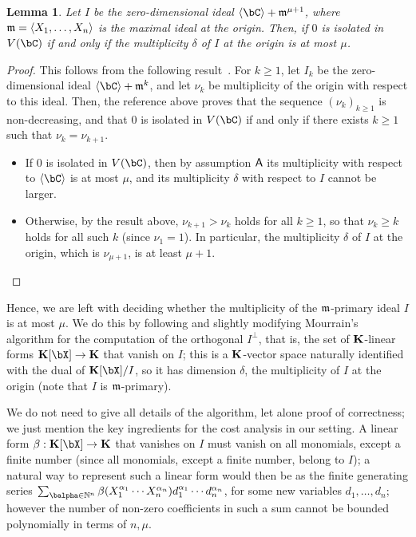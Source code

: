 \documentclass[12pt]{article}
\newtheorem{lemma}[definition]{Lemma}
\begin{document}
\begin{lemma}
  Let $I$ be the zero-dimensional ideal $\langle \bC \rangle +
  \m^{\mu+1}$, where $\mathfrak{m}=\langle X_1,\dots,X_n\rangle$ is the maximal
  ideal at the origin. Then, if $0$ is isolated in $V(\bC)$ if and only
  if the multiplicity $\delta$ of $I$ at the origin is at most $\mu$.
\end{lemma}
\begin{proof}
  This follows from the following
  result~\cite[Theorem~A.1]{BaHaPeSo09}.  For $k \ge 1$, let $I_k$ be
  the zero-dimensional ideal $\langle \bC \rangle + \m^{k}$, and let
  $\nu_k$ be multiplicity of the origin with respect to this
  ideal. Then, the reference above proves that the sequence
  $(\nu_k)_{k \ge 1}$ is non-decreasing, and that $0$ is isolated in
  $V(\bC)$ if and only if there exists $k\ge 1$ such that
  $\nu_k=\nu_{k+1}$.
  \begin{itemize}
  \item If $0$ is isolated in $V(\bC)$, then by assumption $\mathsf{A}$ 
    its multiplicity with respect to $\langle \bC\rangle$ is at most $\mu$,
    and its multiplicity $\delta$ with respect to $I$ cannot be larger.
  \item Otherwise, by the result above, $\nu_{k+1} > \nu_k$ holds for
    all $k \ge 1$, so that $\nu_k \ge k$ holds for all such $k$ (since
    $\nu_1=1$). In particular, the multiplicity $\delta$ of 
 $I$ at the origin, which is $\nu_{\mu+1}$, is at least $\mu+1$.
    \qedhere
  \end{itemize}
\end{proof}

Hence, we are left with deciding whether the multiplicity of the
$\mathfrak{m}$-primary ideal $I$ is at most $\mu$. We do this by following and
slightly modifying Mourrain's algorithm for the computation of the
orthogonal $I^{\perp}$, that is, the set of $\mathbf{K}$-linear forms
$\KK[\bX] \to \KK$ that vanish on $I$; this is a $\mathbf{K}$-vector space
naturally identified with the dual of $\KK[\bX]/I$, so it has dimension
$\delta$, the multiplicity of $I$ at the origin (note that $I$ is $\mathfrak{m}$-primary).

We do not need to give all details of the algorithm, let alone proof
of correctness; we just mention the key ingredients for the cost
analysis in our setting. A linear form $\beta: \KK[\bX] \to \KK$ that
vanishes on $I$ must vanish on all monomials, except a finite number
(since all monomials, except a finite number, belong to $I$); a
natural way to represent such a linear form would then be as the
finite generating series $\sum_{\balpha \in \N^n}
\beta(X_1^{\alpha_1}\cdots X_n^{\alpha_n}) d_1^{\alpha_1}\cdots
d_n^{\alpha_n}$, for some new variables $d_1,\dots,d_n$; however the
number of non-zero coefficients in such a sum cannot be bounded
polynomially in terms of $n,\mu$.
\end{document}
